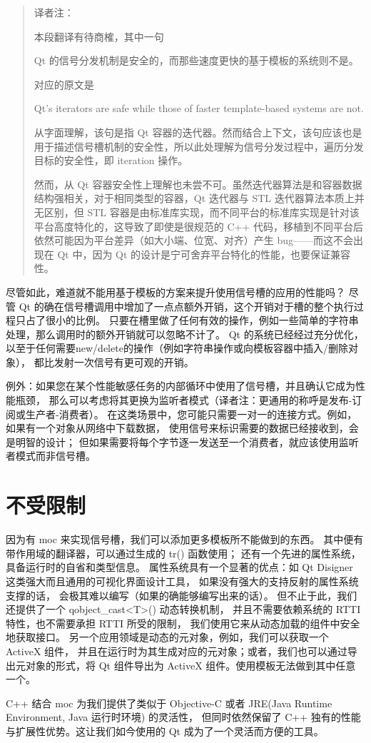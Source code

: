 \begin{quote}
译者注：

本段翻译有待商榷，其中一句

Qt 的信号分发机制是安全的，而那些速度更快的基于模板的系统则不是。

对应的原文是

Qt's iterators are safe while those of faster template-based systems are not.

从字面理解，该句是指 Qt 容器的迭代器。然而结合上下文，该句应该也是用于描述信号槽机制的安全性，所以此处理解为信号分发过程中，遍历分发目标的安全性，即 iteration 操作。

然而，从 Qt 容器安全性上理解也未尝不可。虽然迭代器算法是和容器数据结构强相关，对于相同类型的容器，Qt 迭代器与 STL 迭代器算法本质上并无区别，但 STL 容器是由标准库实现，而不同平台的标准库实现是针对该平台高度特化的，这导致了即使是很规范的 C++ 代码，移植到不同平台后依然可能因为平台差异（如大小端、位宽、对齐）产生 bug——而这不会出现在 Qt 中，因为 Qt 的设计是宁可舍弃平台特化的性能，也要保证兼容性。
\end{quote}


尽管如此，难道就不能用基于模板的方案来提升使用信号槽的应用的性能吗？
尽管 Qt 的确在信号槽调用中增加了一点点额外开销，这个开销对于槽的整个执行过程只占了很小的比例。
只要在槽里做了任何有效的操作，例如一些简单的字符串处理，那么调用时的额外开销就可以忽略不计了。
Qt 的系统已经经过充分优化，以至于任何需要new/delete的操作（例如字符串操作或向模板容器中插入/删除对象），
都比发射一次信号有更可观的开销。

例外：如果您在某个性能敏感任务的内部循环中使用了信号槽，并且确认它成为性能瓶颈，
那么可以考虑将其更换为监听者模式（译者注：更通用的称呼是发布-订阅或生产者-消费者）。
在这类场景中，您可能只需要一对一的连接方式。例如，如果有一个对象从网络中下载数据，
使用信号来标识需要的数据已经接收到，会是明智的设计；
但如果需要将每个字节逐一发送至一个消费者，就应该使用监听者模式而非信号槽。

\section{不受限制}

因为有 moc 来实现信号槽，我们可以添加更多模板所不能做到的东西。
其中便有带作用域的翻译器，可以通过生成的 tr() 函数使用；
还有一个先进的属性系统，具备运行时的自省和类型信息。
属性系统具有一个显著的优点：如 Qt Disigner 这类强大而且通用的可视化界面设计工具，
如果没有强大的支持反射的属性系统支撑的话，
会极其难以编写（如果的确能够编写出来的话）。
但不止于此，我们还提供了一个 qobject\_cast<T>() 动态转换机制，
并且不需要依赖系统的 RTTI 特性，也不需要承担 RTTI 所受的限制，
我们使用它来从动态加载的组件中安全地获取接口。
另一个应用领域是动态的元对象，例如，我们可以获取一个 ActiveX 组件，
并且在运行时为其生成对应的元对象；或者，我们也可以通过导出元对象的形式，将 Qt 组件导出为 ActiveX 组件。使用模板无法做到其中任意一个。

C++ 结合 moc 为我们提供了类似于 Objective-C 或者 JRE(Java Runtime Environment, 
Java 运行时环境) 的灵活性，
但同时依然保留了 C++ 独有的性能与扩展性优势。这让我们如今使用的 Qt 成为了一个灵活而方便的工具。